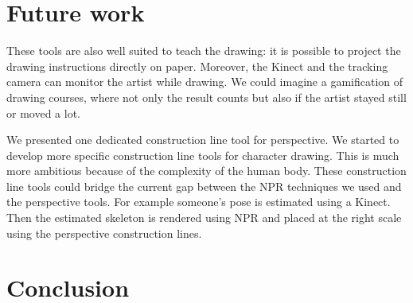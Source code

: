 \documentclass{sigchi}
\begin{document}
 




\section{Future work}

These tools are also well suited to teach the drawing: it is possible to
project the drawing instructions directly on paper. 
Moreover, the 
Kinect and the tracking camera can monitor the artist while drawing. We could
imagine a gamification of drawing courses, where not only the result counts
but also if the artist stayed still or moved a lot.

We presented one dedicated construction line tool for perspective. 
We started to develop more specific construction line tools for
character drawing. This is much more ambitious because of the
complexity of the human body. These construction line tools could
bridge the current gap between the NPR techniques we used and the
perspective tools. For example someone's pose is estimated using a
Kinect. Then the estimated skeleton is rendered using NPR and  placed
at the right scale using the perspective construction lines. 








\section{Conclusion}
\end{document}
